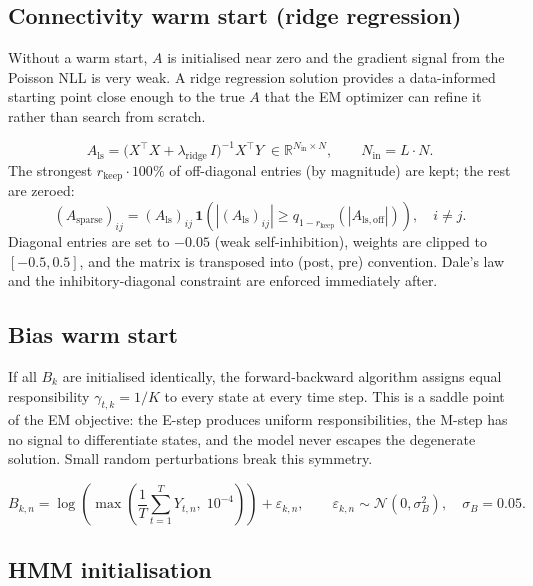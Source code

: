 \documentclass[11pt]{article}
\begin{document}
\subsection{Connectivity warm start (ridge regression)}

Without a warm start, $A$ is initialised near zero and the gradient signal from the
Poisson NLL is very weak.  A ridge regression solution provides a data-informed
starting point close enough to the true $A$ that the EM optimizer can refine it
rather than search from scratch.

\begin{equation}
  A_{\mathrm{ls}} =
  \bigl(X^\top X + \lambda_{\mathrm{ridge}}\,I\bigr)^{-1} X^\top Y
  \;\in\mathbb{R}^{N_{\mathrm{in}}\times N},
  \qquad N_{\mathrm{in}} = L\cdot N.
\end{equation}
The strongest $r_{\mathrm{keep}}\cdot 100\%$ of off-diagonal entries (by magnitude) are
kept; the rest are zeroed:
\begin{equation}
  (A_{\mathrm{sparse}})_{ij} =
  (A_{\mathrm{ls}})_{ij}\,
  \mathbf{1}\!\left(|(A_{\mathrm{ls}})_{ij}|\ge
    q_{1-r_{\mathrm{keep}}}\!\left(|A_{\mathrm{ls,off}}|\right)\right),
  \quad i\neq j.
\end{equation}
Diagonal entries are set to $-0.05$ (weak self-inhibition), weights are clipped to
$[-0.5, 0.5]$, and the matrix is transposed into (post, pre) convention.
Dale's law and the inhibitory-diagonal constraint are enforced immediately after.

\subsection{Bias warm start}

If all $B_k$ are initialised identically, the forward-backward algorithm assigns equal
responsibility $\gamma_{t,k}=1/K$ to every state at every time step.  This is a saddle
point of the EM objective: the E-step produces uniform responsibilities, the M-step has
no signal to differentiate states, and the model never escapes the degenerate solution.
Small random perturbations break this symmetry.

\begin{equation}
  B_{k,n} = \log\!\left(\max\!\left(\frac{1}{T}\sum_{t=1}^T Y_{t,n},\;10^{-4}\right)\right)
            + \varepsilon_{k,n},
  \qquad
  \varepsilon_{k,n}\sim\mathcal{N}(0,\sigma_B^2),
  \quad \sigma_B = 0.05.
\end{equation}

\subsection{HMM initialisation}
\end{document}
